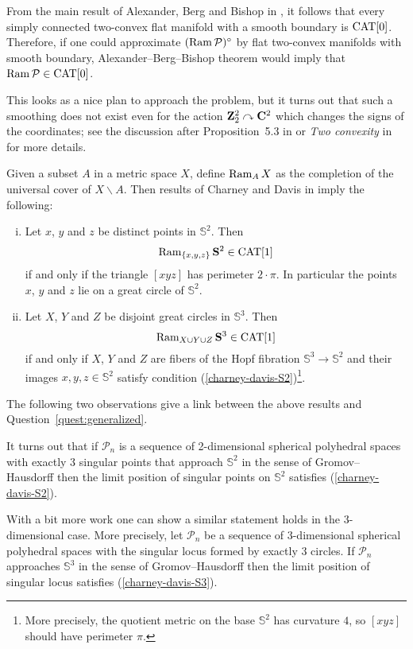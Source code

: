 \documentclass{compositio}
\begin{document}
From the main result of Alexander, Berg and Bishop  in \cite{ABB},
it follows that every simply connected two-convex flat manifold with a smooth boundary is $\mathrm{CAT}[0]$. Therefore, if one could approximate  $(\mathop{\rm Ram}\nolimits  \mathcal{P})^\circ$ by flat two-convex manifolds with smooth boundary, Alexander--Berg--Bishop theorem would imply that $\Ram  \mathcal{P}\z\in\CAT[0]$.

This looks as a nice plan to approach the problem, but it turns out that such a smoothing does not exist even for the action $\mathbf{Z}_2^2\curvearrowright\mathbf{C}^2$ which changes the signs of the coordinates;
see the discussion after Proposition~5.3 in \cite{panov-petrunin}
or \emph{Two convexity} in \cite{petrunin-orthodox} for more details.

Given a subset $A$ in a metric space $X$,
define $\mathop{\rm Ram}\nolimits_A X$ as  the completion of the universal cover of $X\backslash A$.
Then results of  Charney and Davis in \cite{charney-davis-93} imply the following:
\begin{enumerate}[(i)]
\item\label{charney-davis-S2} Let $x$, $y$ and $z$ be distinct points in $\mathbb{S}^2$.
Then
$$\mathop{\rm Ram}\nolimits_{\{x,y,z\}}\mathbf{S}^2\in \mathrm{CAT}[1]$$
if and only if the triangle $[xyz]$ has perimeter $2\cdot\pi$.
In particular the points $x$, $y$ and $z$ lie on a great circle of $\mathbb{S}^2$.
\item\label{charney-davis-S3}
Let $X$, $Y$ and $Z$ be disjoint great circles in $\mathbb{S}^3$.
Then
$$\mathop{\rm Ram}\nolimits_{X\cup Y\cup Z}\mathbf{S}^3\in\mathrm{CAT}[1]$$ if and only if $X$, $Y$ and $Z$ are fibers of the Hopf fibration $\mathbb{S}^3\to \mathbb{S}^2$ and their images $x,y,z\in \mathbb{S}^2$ satisfy condition (\ref{charney-davis-S2})\footnote{More precisely, the  quotient metric on the base $\mathbb{S}^2$ has curvature $4$, so $[xyz]$ should have perimeter $\pi$.}.
\end{enumerate}

The following two observations give a link between the above results and Question~\ref{quest:generalized}.

It turns out that if $\mathcal{P}_n$ is a sequence of 2-dimensional spherical polyhedral spaces with exactly 3 singular points that approach $\mathbb{S}^2$ in the sense of Gromov--Hausdorff then
the limit position of singular points on $\mathbb{S}^2$ satisfies (\ref{charney-davis-S2}).

With a bit more work one can show a similar statement holds in the 3-dimensional case.
More precisely, let $\mathcal{P}_n$ be a sequence of 3-dimensional spherical polyhedral spaces with the singular locus formed by exactly 3 circles.
If $\mathcal{P}_n$ approaches $\mathbb{S}^3$ in the sense of Gromov--Hausdorff then the limit position of singular locus  satisfies (\ref{charney-davis-S3}).
\end{document}
